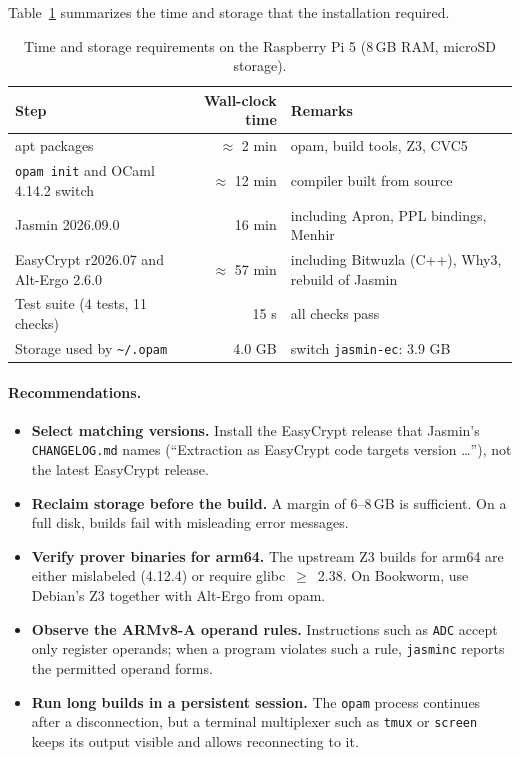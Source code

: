 \documentclass[11pt,a4paper]{article}
\newcommand{\file}[1]{\texttt{#1}}
\begin{document}
Table~\ref{tab:summary} summarizes the time and storage that the
installation required.

\begin{table}[h]
\centering\small
\begin{tabularx}{\textwidth}{@{}lrX@{}}
\toprule
\textbf{Step} & \textbf{Wall-clock time} & \textbf{Remarks} \\
\midrule
apt packages                          & $\approx$ 2 min  & opam, build tools, Z3, CVC5 \\
\texttt{opam init} and OCaml 4.14.2 switch & $\approx$ 12 min & compiler built from source \\
Jasmin 2026.09.0                      & 16 min          & including Apron, PPL bindings, Menhir \\
EasyCrypt r2026.07 and Alt-Ergo 2.6.0 & $\approx$ 57 min & including Bitwuzla (C++), Why3, rebuild of Jasmin \\
Test suite (4 tests, 11 checks)       & 15 s            & all checks pass \\
\midrule
Storage used by \file{\textasciitilde/.opam} & 4.0 GB  & switch \texttt{jasmin-ec}: 3.9 GB \\
\bottomrule
\end{tabularx}
\caption{Time and storage requirements on the Raspberry Pi 5 (8\,GB RAM, microSD storage).}
\label{tab:summary}
\end{table}

\paragraph{Recommendations.}
\begin{itemize}[leftmargin=*]
  \item \textbf{Select matching versions.} Install the EasyCrypt release
        that Jasmin's \file{CHANGELOG.md} names (``Extraction as EasyCrypt
        code targets version \dots''), not the latest EasyCrypt release.
  \item \textbf{Reclaim storage before the build.} A margin of 6--8\,GB is
        sufficient. On a full disk, builds fail with misleading error
        messages.
  \item \textbf{Verify prover binaries for arm64.} The upstream Z3 builds
        for arm64 are either mislabeled (4.12.4) or require
        glibc~$\geq$~2.38. On Bookworm, use Debian's Z3 together with
        Alt-Ergo from opam.
  \item \textbf{Observe the ARMv8-A operand rules.} Instructions such as
        \texttt{ADC} accept only register operands; when a program violates
        such a rule, \texttt{jasminc} reports the permitted operand forms.
  \item \textbf{Run long builds in a persistent session.} The \texttt{opam}
        process continues after a disconnection, but a terminal multiplexer
        such as \texttt{tmux} or \texttt{screen} keeps its output visible
        and allows reconnecting to it.
\end{itemize}
\end{document}
